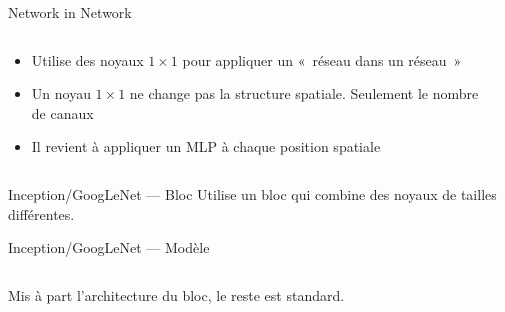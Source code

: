 \begin{frame}{Network in Network}
  \begin{columns}
    \begin{column}{0.4\textwidth}
      \begin{itemize}[<+->]
        \item Utilise des noyaux $1 \times 1$ pour appliquer un «~réseau dans un réseau~»
        \item Un noyau $1 \times 1$ ne change pas la structure spatiale. Seulement le nombre de canaux
        \item Il revient à appliquer un MLP à chaque position spatiale
      \end{itemize}
    \end{column}
    \begin{column}{0.6\textwidth}
    \end{column}
  \end{columns}
\end{frame}

\begin{frame}{Inception/GoogLeNet --- Bloc}
  Utilise un bloc qui combine des noyaux de tailles différentes.

\end{frame}

\begin{frame}{Inception/GoogLeNet --- Modèle}
  \begin{columns}
    \begin{column}{0.6\textwidth}
      Mis à part l'architecture du bloc, le reste est standard.
    \end{column}
    \begin{column}{0.4\textwidth}
    \end{column}
  \end{columns}
\end{frame}

